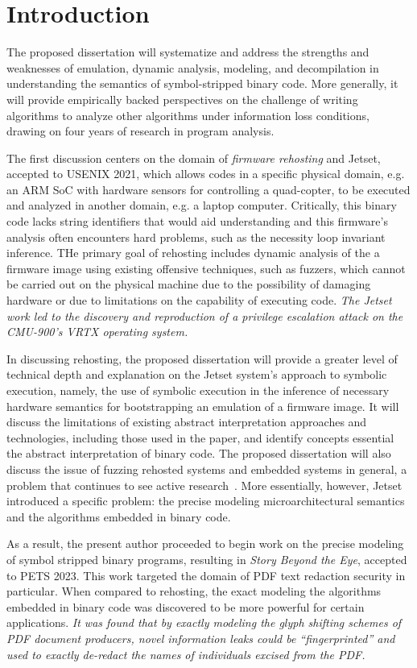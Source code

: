\section{Introduction}
\label{intro}

The proposed dissertation will systematize and address the strengths and weaknesses of emulation, dynamic analysis, modeling, and decompilation in understanding the semantics of symbol-stripped binary code.
More generally, it will provide empirically backed perspectives on the challenge of writing algorithms to analyze other algorithms under information loss conditions, drawing on four years of research in program analysis.

The first discussion centers on the domain of \emph{firmware rehosting} and Jetset, accepted to USENIX 2021, which allows codes in a specific physical domain, e.g. an ARM SoC with hardware sensors for controlling a quad-copter, to be executed and analyzed in another domain, e.g. a laptop computer.
Critically, this binary code lacks string identifiers that would aid understanding and this firmware's analysis often encounters hard problems, such as the necessity loop invariant inference.
THe primary goal of rehosting includes dynamic analysis of the a firmware image using existing offensive techniques, such as fuzzers, which cannot be carried out on the physical machine due to the possibility of damaging hardware or due to limitations on the capability of executing code.
\emph{The Jetset work led to the discovery and reproduction of a privilege escalation attack on the CMU-900's VRTX operating system.}

In discussing rehosting, the proposed dissertation will provide a greater level of technical depth and explanation on the Jetset system's approach to symbolic execution, namely, the use of symbolic execution in the inference of necessary hardware semantics for bootstrapping an emulation of a firmware image.
It will discuss the limitations of existing abstract interpretation approaches and technologies, including those used in the paper, and identify concepts essential the abstract interpretation of binary code.
The proposed dissertation will also discuss the issue of fuzzing rehosted systems and embedded systems in general, a problem that continues to see active research~\cite{zhu2022fuzzing}.
More essentially, however, Jetset introduced a specific problem: the precise modeling microarchitectural semantics and the algorithms embedded in binary code.

As a result, the present author proceeded to begin work on the precise modeling of symbol stripped binary programs, resulting in \emph{Story Beyond the Eye}, accepted to PETS 2023.
This work targeted the domain of PDF text redaction security in particular.
When compared to rehosting, the exact modeling the algorithms embedded in binary code was discovered to be more powerful for certain applications.
\emph{It was found that by exactly modeling the glyph shifting schemes of PDF document producers, novel information leaks could be ``fingerprinted'' and used to exactly de-redact the names of individuals excised from the PDF.}

